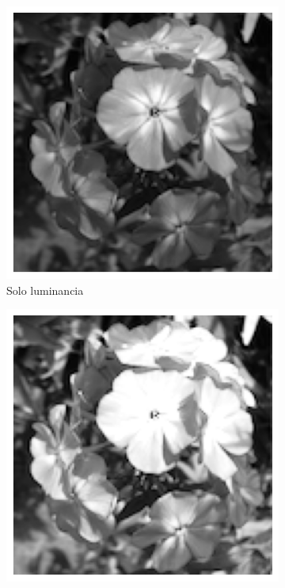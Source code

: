 \documentclass{article}
\begin{document}
\begin{figure}
\begin{subfigure}[b]{0.24\textwidth}
		\includegraphics[width= \textwidth]{imgGrau}
		\caption{Solo luminancia}
		\label{fg:imgGrau}
	\end{subfigure}
	\begin{subfigure}[b]{0.24\textwidth}
		\includegraphics[width= \textwidth]{saturada}

\end{subfigure}
\end{figure}
\end{document}
